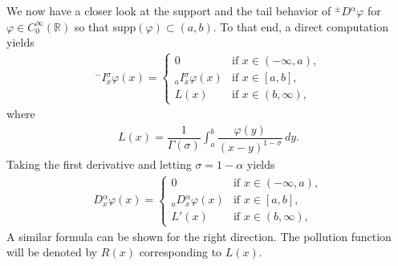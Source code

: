 \documentclass[leqno,final]{siamltex}
\numberwithin{equation}{section}
\renewcommand{\(}{\bigl(}
\renewcommand{\)}{\bigr)}
\newcommand{\R}{\mathbb{R}}
\begin{document}
        We now have a closer look at the support and the tail behavior of ${^{\pm}}{D}{^{\alpha}} \varphi$ for $\varphi \in C^{\infty}_{0}(\R)$ so 
        that $\mbox{supp}(\varphi)\subset (a,b)$. To that end, a direct computation yields 
        \begin{align}\label{eq2.20a}
            {^{-}}{{I}}{^{\sigma}_{x}} \varphi (x) = 
                \begin{cases} 
                    0 &\text{if } x \in (-\infty , a ),\\
                    {_{a}}{{I}}{^{\sigma}_{x}} \varphi(x) & \text{if } x \in [a,b],\\
                    L(x) & \text{if } x \in (b ,\infty), 
                \end{cases}
        \end{align}
        where
        \begin{align}\label{2.20b}
            L(x) = \dfrac{1}{\Gamma( \sigma)} \int_{a}^{b} \dfrac{\varphi(y)}{(x -y)^{1 - \sigma}} \, dy.
        \end{align}
        Taking the first derivative and letting $ \sigma=1-\alpha$ yields
        \begin{align} \label{LAction}
            {}{{D}}{^{\alpha}_{x}} \varphi(x) = 
                \begin{cases} 
                    0 &\text{if } x \in ( -\infty , a),\\
                    {_{a}}{{D}}{^{\alpha}_{x}} \varphi(x) & \text{if } x \in  [a,b],\\
                    L'(x) &\text{if } x \in  (b, \infty),
                \end{cases}
        \end{align}
   A similar formula can be shown for the right direction. The pollution function 
  will be denoted by $R(x)$ corresponding to $L(x)$.
\end{document}
